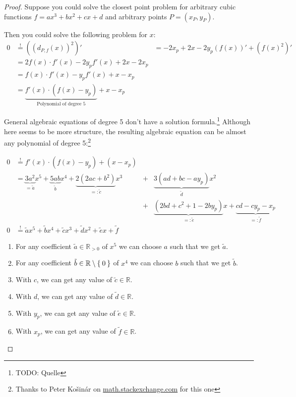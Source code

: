 \documentclass[a4paper]{scrartcl}
\theoremstyle{break}
\def\mdr{\ensuremath{\mathbb{R}}}
\theoremstyle{nonumberplain}
\newtheorem{proof}{Proof:}
\def\mdr{\ensuremath{\mathbb{R}}}
\begin{document}
\begin{proof}
    Suppose you could solve the closest point problem for arbitrary
    cubic functions $f = ax^3 + bx^2 + cx + d$ and arbitrary points $P = (x_P, y_P)$.

    Then you could solve the following problem for $x$:
    \begin{align}
        0  &\stackrel{!}{=} \left ((d_{P,f}(x))^2 \right )'
           &=-2 x_p + 2x -2y_p(f(x))' + (f(x)^2)'\\
           &= 2 f(x) \cdot f'(x) - 2 y_p f'(x) + 2x - 2 x_p\\
           &= f(x) \cdot f'(x) - y_p f'(x) + x - x_p\\
           &= \underbrace{f'(x) \cdot \left (f(x) - y_p \right )}_{\text{Polynomial of degree 5}} + x - x_p
    \end{align}

    General algebraic equations of degree 5 don't have a solution formula.\footnote{TODO: Quelle}
    Although here seems to be more structure, the resulting algebraic
    equation can be almost any polynomial of degree 5:\footnote{Thanks to Peter Košinár on \href{http://math.stackexchange.com/a/584814/6876}{math.stackexchange.com} for this one}

    \begin{align}
        0  &\stackrel{!}{=} f'(x) \cdot \left (f(x) - y_p \right ) + (x - x_p)\\
        &= \underbrace{3 a^2}_{= \tilde{a}} x^5 + \underbrace{5ab}_{\tilde{b}}x^4 + \underbrace{2(2ac + b^2 )}_{=: \tilde{c}}x^3 &+& \underbrace{3(ad+bc-ay_p)}_{\tilde{d}} x^2 \\
        & &+& \underbrace{(2 b d+c^2+1-2 b y_p)}_{=: \tilde{e}}x+\underbrace{c d-c y_p-x_p}_{=: \tilde{f}}\\
        0 &\stackrel{!}{=} \tilde{a}x^5 + \tilde{b}x^4 + \tilde{c}x^3 + \tilde{d}x^2 + \tilde{e}x + \tilde{f}
    \end{align}

    \begin{enumerate}
        \item For any coefficient $\tilde{a} \in \mdr_{> 0}$ of $x^5$ we can choose $a$ such that we get $\tilde{a}$.
        \item For any coefficient $\tilde{b} \in \mdr \setminus \Set{0}$ of $x^4$ we can choose $b$ such that we get $\tilde{b}$.
        \item With $c$, we can get any value of $\tilde{c} \in \mdr$.
        \item With $d$, we can get any value of $\tilde{d} \in \mdr$.
        \item With $y_p$, we can get any value of $\tilde{e} \in \mdr$.
        \item With $x_p$, we can get any value of $\tilde{f} \in \mdr$.
    \end{enumerate}


\end{proof}
\end{document}
